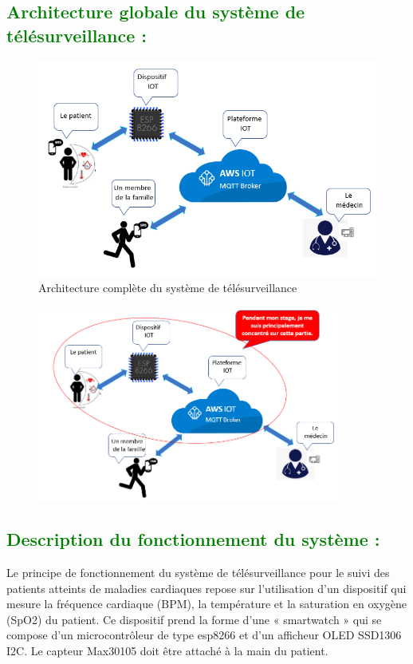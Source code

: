 \begin{flushleft}
	\subsection{\textcolor{green}{Architecture globale du système de télésurveillance :}}
	\begin{figure}[h]
		\centering
		\includegraphics{chapitres/images/architecture.PNG}
		\caption{Architecture complète du système de télésurveillance}
		\label{fig:labelname}
	\end{figure}
	\begin{figure}[h]
		\centering
		\includegraphics[width=0.9\textwidth]{chapitres/images/architecture1.PNG}
		
	\end{figure}
	\newpage
	\subsection{\textcolor{green}{Description du fonctionnement du système :}}
	Le principe de fonctionnement du système de télésurveillance pour le suivi des patients atteints de maladies cardiaques repose sur l'utilisation d'un dispositif qui mesure la fréquence cardiaque (BPM), la température et la saturation en oxygène (SpO2) du patient. Ce dispositif prend la forme d'une « smartwatch » qui se compose d'un microcontrôleur de type esp8266 et d'un afficheur OLED SSD1306 I2C. Le capteur Max30105 doit être attaché à la main du patient.\newline
	

\end{flushleft}
